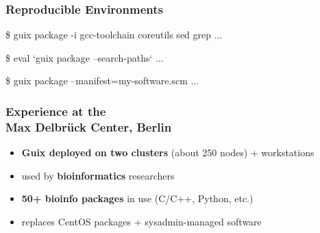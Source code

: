\documentclass{beamer}
\begin{document}
\begin{frame}[fragile]
  \frametitle{Reproducible Environments}

  \begin{semiverbatim}
\$ guix package -i gcc-toolchain coreutils sed grep
\textrm{...}


\$ eval `guix package --search-paths`
\textrm{...}


\$ guix package --manifest=my-software.scm
\textrm{...}
  \end{semiverbatim}

\end{frame}

\begin{frame}
  \frametitle{Experience at the\\Max Delbrück Center, Berlin}

  \large{
  \begin{itemize}
    \item \textbf{Guix deployed on two clusters} (about 250 nodes) + workstations
    \item used by \textbf{bioinformatics} researchers
    \item \textbf{50+ bioinfo packages} in use (C/C++, Python,
      etc.)
    \item replaces CentOS packages + sysadmin-managed software
  \end{itemize}
  }
\end{frame}

\end{document}
